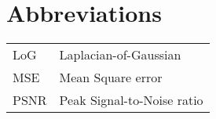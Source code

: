 \documentclass[master=cws, masteroption=vs]{kulemt}
\begin{document}
\section*{Abbreviations}
\begin{flushleft}
  \renewcommand{\arraystretch}{1.1}
  \begin{tabularx}{\textwidth}{@{}p{12mm}X@{}}
    LoG   & Laplacian-of-Gaussian \\
    MSE   & Mean Square error \\
    PSNR  & Peak Signal-to-Noise ratio \\
  \end{tabularx}
\end{flushleft}

\mainmatter

%









%


%


%
%
%
%
%


%
%

\backmatter


\end{document}
